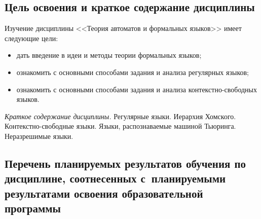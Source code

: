 \documentclass[a4paper,12pt]{article}
\begin{document}
\subsection{Цель освоения и краткое содержание дисциплины}
  
  Изучение дисциплины <<Теория автоматов и формальных языков>> имеет следующие цели:
  \begin{itemize}
    \item дать введение в идеи и методы теории формальных языков; 
    \item ознакомить с основными способами задания и анализа регулярных языков; 
    \item ознакомить с основными способами задания и анализа контекстно-свободных языков. 
  \end{itemize}
  
  
  \textit{Краткое содержание дисциплины.} Регулярные языки. Иерархия Хомского. Контекстно-свободные языки. Языки, распознаваемые машиной Тьюринга. Неразрешимые языки.
  
  



\subsection{Перечень планируемых результатов обучения по дисциплине, соотнесенных с~планируемыми результатами освоения образовательной программы}
\end{document}
